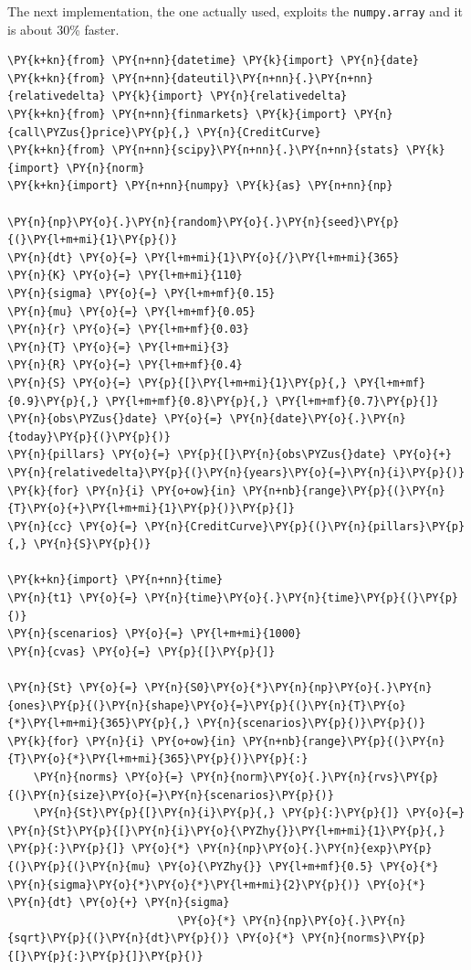 \begin{Answer}
The next implementation, the one actually used, exploits the \texttt{numpy.array} and it is about 30\% faster.

\begin{codebox}[size=fbox, boxrule=1pt, colback=cellbackground, colframe=cellborder]
\begin{Verbatim}[commandchars=\\\{\}]
\PY{k+kn}{from} \PY{n+nn}{datetime} \PY{k}{import} \PY{n}{date}
\PY{k+kn}{from} \PY{n+nn}{dateutil}\PY{n+nn}{.}\PY{n+nn}{relativedelta} \PY{k}{import} \PY{n}{relativedelta}
\PY{k+kn}{from} \PY{n+nn}{finmarkets} \PY{k}{import} \PY{n}{call\PYZus{}price}\PY{p}{,} \PY{n}{CreditCurve}
\PY{k+kn}{from} \PY{n+nn}{scipy}\PY{n+nn}{.}\PY{n+nn}{stats} \PY{k}{import} \PY{n}{norm}
\PY{k+kn}{import} \PY{n+nn}{numpy} \PY{k}{as} \PY{n+nn}{np}
		
\PY{n}{np}\PY{o}{.}\PY{n}{random}\PY{o}{.}\PY{n}{seed}\PY{p}{(}\PY{l+m+mi}{1}\PY{p}{)}
\PY{n}{dt} \PY{o}{=} \PY{l+m+mi}{1}\PY{o}{/}\PY{l+m+mi}{365}
\PY{n}{K} \PY{o}{=} \PY{l+m+mi}{110}
\PY{n}{sigma} \PY{o}{=} \PY{l+m+mf}{0.15}
\PY{n}{mu} \PY{o}{=} \PY{l+m+mf}{0.05}
\PY{n}{r} \PY{o}{=} \PY{l+m+mf}{0.03}
\PY{n}{T} \PY{o}{=} \PY{l+m+mi}{3}
\PY{n}{R} \PY{o}{=} \PY{l+m+mf}{0.4}
\PY{n}{S} \PY{o}{=} \PY{p}{[}\PY{l+m+mi}{1}\PY{p}{,} \PY{l+m+mf}{0.9}\PY{p}{,} \PY{l+m+mf}{0.8}\PY{p}{,} \PY{l+m+mf}{0.7}\PY{p}{]}
\PY{n}{obs\PYZus{}date} \PY{o}{=} \PY{n}{date}\PY{o}{.}\PY{n}{today}\PY{p}{(}\PY{p}{)}
\PY{n}{pillars} \PY{o}{=} \PY{p}{[}\PY{n}{obs\PYZus{}date} \PY{o}{+} \PY{n}{relativedelta}\PY{p}{(}\PY{n}{years}\PY{o}{=}\PY{n}{i}\PY{p}{)} \PY{k}{for} \PY{n}{i} \PY{o+ow}{in} \PY{n+nb}{range}\PY{p}{(}\PY{n}{T}\PY{o}{+}\PY{l+m+mi}{1}\PY{p}{)}\PY{p}{]}
\PY{n}{cc} \PY{o}{=} \PY{n}{CreditCurve}\PY{p}{(}\PY{n}{pillars}\PY{p}{,} \PY{n}{S}\PY{p}{)}
		
\PY{k+kn}{import} \PY{n+nn}{time}
\PY{n}{t1} \PY{o}{=} \PY{n}{time}\PY{o}{.}\PY{n}{time}\PY{p}{(}\PY{p}{)}
\PY{n}{scenarios} \PY{o}{=} \PY{l+m+mi}{1000}
\PY{n}{cvas} \PY{o}{=} \PY{p}{[}\PY{p}{]}
		
\PY{n}{St} \PY{o}{=} \PY{n}{S0}\PY{o}{*}\PY{n}{np}\PY{o}{.}\PY{n}{ones}\PY{p}{(}\PY{n}{shape}\PY{o}{=}\PY{p}{(}\PY{n}{T}\PY{o}{*}\PY{l+m+mi}{365}\PY{p}{,} \PY{n}{scenarios}\PY{p}{)}\PY{p}{)}    
\PY{k}{for} \PY{n}{i} \PY{o+ow}{in} \PY{n+nb}{range}\PY{p}{(}\PY{n}{T}\PY{o}{*}\PY{l+m+mi}{365}\PY{p}{)}\PY{p}{:}
    \PY{n}{norms} \PY{o}{=} \PY{n}{norm}\PY{o}{.}\PY{n}{rvs}\PY{p}{(}\PY{n}{size}\PY{o}{=}\PY{n}{scenarios}\PY{p}{)}
    \PY{n}{St}\PY{p}{[}\PY{n}{i}\PY{p}{,} \PY{p}{:}\PY{p}{]} \PY{o}{=} \PY{n}{St}\PY{p}{[}\PY{n}{i}\PY{o}{\PYZhy{}}\PY{l+m+mi}{1}\PY{p}{,} \PY{p}{:}\PY{p}{]} \PY{o}{*} \PY{n}{np}\PY{o}{.}\PY{n}{exp}\PY{p}{(}\PY{p}{(}\PY{n}{mu} \PY{o}{\PYZhy{}} \PY{l+m+mf}{0.5} \PY{o}{*} \PY{n}{sigma}\PY{o}{*}\PY{o}{*}\PY{l+m+mi}{2}\PY{p}{)} \PY{o}{*} \PY{n}{dt} \PY{o}{+} \PY{n}{sigma}
                          \PY{o}{*} \PY{n}{np}\PY{o}{.}\PY{n}{sqrt}\PY{p}{(}\PY{n}{dt}\PY{p}{)} \PY{o}{*} \PY{n}{norms}\PY{p}{[}\PY{p}{:}\PY{p}{]}\PY{p}{)}
\end{Verbatim}
\end{codebox}


\end{Answer}
